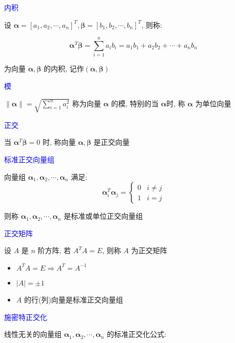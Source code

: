 \begin{definition}[向量的内积和正交]
	\textcolor{blue}{内积}
	
	设 $\boldsymbol{\alpha} = [a_{1},a_{2},\cdots,a_{n}]^{T}, \boldsymbol{\beta} = [b_{1},b_{2},\cdots,b_{n}]^{T}$, 则称: 

	$$\boldsymbol{\alpha}^{T}\boldsymbol{\beta} = \sum\limits_{i=1}^{n}a_{i}b_{i}=a_{1}b_{1}+a_{2}b_{2}+\cdots+a_{n}b_{n}$$
	
	为向量 $\boldsymbol{\alpha},\boldsymbol{\beta}$ 的内积, 记作$(\boldsymbol{\alpha}, \boldsymbol{\beta})$
	
	\textcolor{blue}{模}

	$\|\boldsymbol{\alpha}\| = \sqrt{\sum\limits_{i=1}^{n}a_{i}^2}$ 称为向量 $\boldsymbol{\alpha}$ 的模, 特别的当 $\boldsymbol{\alpha}$时, 称 $\boldsymbol{\alpha}$ 为单位向量
	
	\textcolor{blue}{正交}
	
	当 $\boldsymbol{\alpha}^{T}\boldsymbol{\beta}=0$ 时, 称向量 $\boldsymbol{\alpha}, \boldsymbol{\beta}$ 是正交向量
	
	\textcolor{blue}{标准正交向量组}
	
	向量组 $\boldsymbol{\alpha}_{1}, \boldsymbol{\alpha}_{2}, \cdots, \boldsymbol{\alpha}_{n}$ 满足:  
	$$\boldsymbol{\alpha}_{i}^{T} \boldsymbol{\alpha}_{j} =  
	\begin{cases}
		0 & i\neq j\\
		1 & i= j
	\end{cases}$$
	
	则称 $\boldsymbol{\alpha}_{1}, \boldsymbol{\alpha}_{2}, \cdots, \boldsymbol{\alpha}_{n}$ 是标准或单位正交向量组

	\textcolor{blue}{正交矩阵}

	设 $A$ 是 $n$ 阶方阵, 若 $A^{T}A=E$, 则称 $A$ 为正交矩阵
	\begin{itemize}
		\item $A^{T}A=E\Rightarrow A^{T}=A^{-1}$
		\item $|A| = \pm 1$
		\item $A$ 的行(列)向量是标准正交向量组
	\end{itemize}
	
	\textcolor{blue}{施密特正交化}
	
	线性无关的向量组 $\boldsymbol{\alpha}_{1}, \boldsymbol{\alpha}_{2}, \cdots, \boldsymbol{\alpha}_{n}$ 的标准正交化公式:
	

\end{definition}
